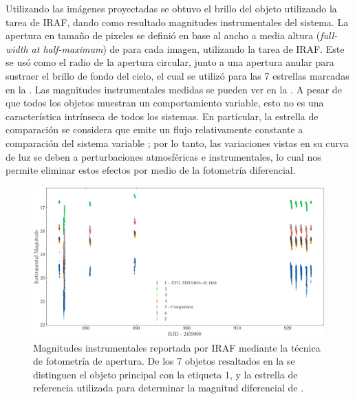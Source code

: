 Utilizando las imágenes proyectadas se obtuvo el brillo del objeto utilizando
la tarea  de IRAF, dando como resultado magnitudes instrumentales
del sistema. La apertura en tamaño de pixeles se definió en base al ancho a
media altura (\textit{full-width at half-maximum}) de \atoObjId para cada
imagen, utilizando la tarea  de IRAF. Este se usó como el radio de
la apertura circular, junto a una apertura anular para sustraer el brillo de
fondo del cielo, el cual se utilizó para las 7 estrellas marcadas en la
. Las magnitudes instrumentales medidas se pueden ver
en la . A pesar de que todos los
objetos muestran un comportamiento variable, esto no es una característica
intrínseca de todos los sistemas. En particular, la estrella de comparación se
considera que emite un flujo relativamente constante a comparación del sistema
variable \atoObjIdNoSpace; por lo tanto, las variaciones vistas en su curva de
luz se deben a perturbaciones atmosféricas e instrumentales, lo cual nos permite
eliminar estos efectos por medio de la fotometría diferencial.

\begin{figure}[!ht]
	\centering
	\includegraphics[scale=0.4]{Observaciones/Secciones/Figures/Figura Magnitud Instrumental Todas.png}
	\caption{Magnitudes instrumentales reportada por IRAF mediante la técnica de
	fotometría de apertura. De los 7 objetos resaltados en la
	 se distinguen el objeto principal \atoObjId con
	la etiqueta $1$, y la estrella de referencia utilizada para determinar la
	magnitud diferencial de \atoObjIdNoSpace. }
	\label{figuraCurvaLuzInstrumentalTodas}
\end{figure}

